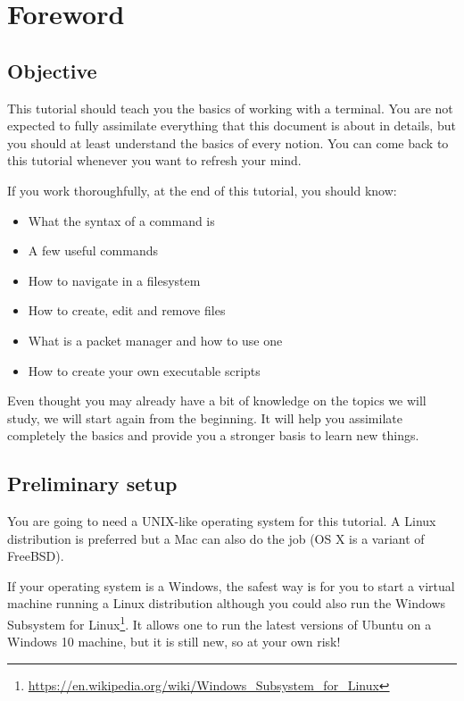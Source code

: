 \documentclass[12pt]{article}
\begin{document}

\tableofcontents
\pagebreak


\section{Foreword}

\subsection{Objective}
This tutorial should teach you the basics of working with a terminal. You are not expected to fully assimilate everything that this document is about in details, but you should at least understand the basics of every notion. You can come back to this tutorial whenever you want to refresh your mind.

If you work thoroughfully, at the end of this tutorial, you should know:

\begin{itemize}
\item What the syntax of a command is
\item A few useful commands
\item How to navigate in a filesystem
\item How to create, edit and remove files
\item What is a packet manager and how to use one
\item How to create your own executable scripts
\end{itemize}

Even thought you may already have a bit of knowledge on the topics we will study, we will start again from the beginning. It will help you assimilate completely the basics and provide you a stronger basis to learn new things.

\subsection{Preliminary setup}

You are going to need a UNIX-like operating system for this tutorial.
A Linux distribution is preferred but a Mac can also do the job (OS X is a variant of FreeBSD).

If your operating system is a Windows, the safest way is for you to start a virtual machine running a Linux distribution although you could also run the Windows Subsystem for Linux\footnote{\url{https://en.wikipedia.org/wiki/Windows_Subsystem_for_Linux}}. It allows one to run the latest versions of Ubuntu on a Windows 10 machine, but it is still new, so at your own risk!
\end{document}
